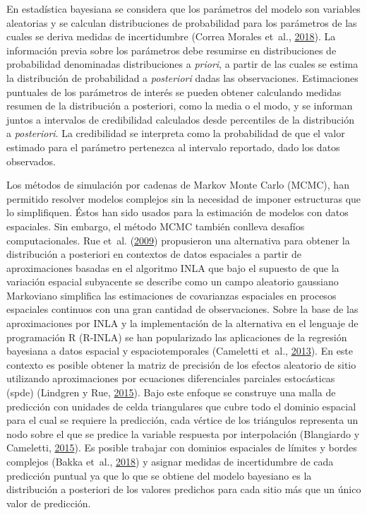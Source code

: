 \documentclass[11pt,b5paper,]{krantz}
\begin{document}
En estadística bayesiana se considera que los parámetros del modelo son variables aleatorias y se calculan distribuciones de probabilidad para los parámetros de las cuales se deriva medidas de incertidumbre (Correa Morales et~al., \protect\hyperlink{ref-Correa_Morales_Causil_Javier_2018}{2018}). La información previa sobre los parámetros debe resumirse en distribuciones de probabilidad denominadas distribuciones a \emph{priori}, a partir de las cuales se estima la distribución de probabilidad a \emph{posteriori} dadas las observaciones. Estimaciones puntuales de los parámetros de interés se pueden obtener calculando medidas resumen de la distribución a posteriori, como la media o el modo, y se informan juntos a intervalos de credibilidad calculados desde percentiles de la distribución a \emph{posteriori}. La credibilidad se interpreta como la probabilidad de que el valor estimado para el parámetro pertenezca al intervalo reportado, dado los datos observados.

Los métodos de simulación por cadenas de Markov Monte Carlo (MCMC), han permitido resolver modelos complejos sin la necesidad de imponer estructuras que lo simplifiquen. Éstos han sido usados para la estimación de modelos con datos espaciales. Sin embargo, el método MCMC también conlleva desafíos computacionales. Rue et~al. (\protect\hyperlink{ref-Rue_Martino_Chopin_2009}{2009}) propusieron una alternativa para obtener la distribución a posteriori en contextos de datos espaciales a partir de aproximaciones basadas en el algoritmo INLA que bajo el supuesto de que la variación espacial subyacente se describe como un campo aleatorio gaussiano Markoviano simplifica las estimaciones de covarianzas espaciales en procesos espaciales continuos con una gran cantidad de observaciones. Sobre la base de las aproximaciones por INLA y la implementación de la alternativa en el lenguaje de programación R (R-INLA) se han popularizado las aplicaciones de la regresión bayesiana a datos espacial y espaciotemporales (Cameletti et~al., \protect\hyperlink{ref-Cameletti_Lindgren_Simpson_Rue_2013}{2013}). En este contexto es posible obtener la matriz de precisión de los efectos aleatorio de sitio utilizando aproximaciones por ecuaciones diferenciales parciales estocásticas (spde) (Lindgren y Rue, \protect\hyperlink{ref-Lindgren_Rue_2015}{2015}). Bajo este enfoque se construye una malla de predicción con unidades de celda triangulares que cubre todo el dominio espacial para el cual se requiere la predicción, cada vértice de los triángulos representa un nodo sobre el que se predice la variable respuesta por interpolación (Blangiardo y Cameletti, \protect\hyperlink{ref-Blangiardo_Cameletti_2015}{2015}). Es posible trabajar con dominios espaciales de límites y bordes complejos (Bakka et~al., \protect\hyperlink{ref-Bakka_Rue_Fuglstad_Riebler_Bolin_Illian_Krainski_Simpson_Lindgren_2018}{2018}) y asignar medidas de incertidumbre de cada predicción puntual ya que lo que se obtiene del modelo bayesiano es la distribución a posteriori de los valores predichos para cada sitio más que un único valor de predicción.
\end{document}
